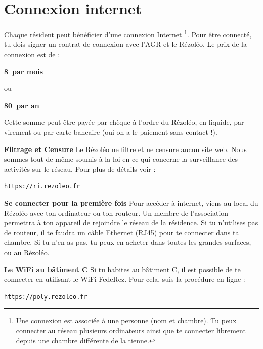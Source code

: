 \documentclass[12pt]{article}
\begin{document}
\section{Connexion internet}
  Chaque résident peut bénéficier d’une connexion Internet \footnote{Une connexion est associée à une personne (nom et chambre). Tu peux connecter au réseau plusieurs ordinateurs ainsi que te connecter librement depuis une chambre différente de la tienne.}. Pour être connecté, tu dois signer un contrat de connexion avec l’AGR  et le Rézoléo. Le prix de la connexion est de :
  {\begin{center}
    \textbf{8\EUR~par mois}
  \end{center}
  \centerline{ou}
  \begin{center}
    \textbf{80\EUR~par an}
  \end{center}

  Cette somme peut être payée par chèque à l’ordre du Rézoléo, en liquide, par virement ou par carte bancaire (oui on a le paiement sans contact !).
  \begin{description}
    \item \textbf{Filtrage et Censure}\vspace*{0.5cm} \newline Le Rézoléo ne filtre et ne censure aucun site web. Nous sommes tout de même soumis à la loi en ce qui concerne la surveillance des activités sur le réseau. Pour plus de détails voir :
    \begin{center}
      \verb|https://ri.rezoleo.fr|
    \end{center}
    \item \textbf{Se connecter pour la première fois}\vspace*{0.5cm} \newline Pour accéder à internet, viens au local du Rézoléo avec ton ordinateur ou ton routeur. Un membre de l’association permettra à ton appareil de rejoindre le réseau de la résidence. Si tu n'utilises pas de routeur, il te faudra un câble Ethernet (RJ45) pour te connecter dans ta chambre. Si tu n’en as pas, tu peux en acheter dans toutes les grandes surfaces, ou au Rézoléo.  
    \item \textbf{Le WiFi au bâtiment C}\vspace*{0.5cm} \newline Si tu habites au bâtiment C, il est possible de te connecter en utilisant le WiFi FedeRez. Pour cela, suis la procédure en ligne : 
    \begin{center}
      \verb|https://poly.rezoleo.fr|
    \end{center}


\end{description}}
\end{document}
